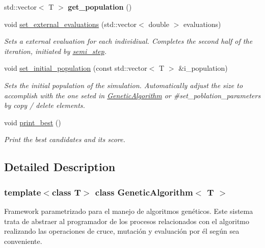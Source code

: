 \begin{DoxyCompactItemize}
\mbox{\label{class_genetic_algorithm_a3265574d1fe7cbe5975ca55ac15cb3d7}} 
std\+::vector$<$ T $>$ {\bfseries get\+\_\+population} ()
\item 
void \mbox{\hyperlink{class_genetic_algorithm_af1632165d5b43d91b290a8a257e0f0e7}{set\+\_\+external\+\_\+evaluations}} (std\+::vector$<$ double $>$ evaluations)
\begin{DoxyCompactList}\small\item\em Sets a external evaluation for each individiual. Completes the second half of the iteration, initiated by \mbox{\hyperlink{class_genetic_algorithm_ab52124a783d776e8ba658bf665e0be66}{semi\+\_\+step}}. \end{DoxyCompactList}\item 
void \mbox{\hyperlink{class_genetic_algorithm_a5ed6d3f823943638e0c3688fdf788e1c}{set\+\_\+initial\+\_\+population}} (const std\+::vector$<$ T $>$ \&i\+\_\+population)
\begin{DoxyCompactList}\small\item\em Sets the initial population of the simulation. Automatically adjust the size to accomplish with the one seted in \mbox{\hyperlink{class_genetic_algorithm}{Genetic\+Algorithm}} or \#set\+\_\+poblation\+\_\+parameters by copy / delete elements. \end{DoxyCompactList}\item 
\mbox{\label{class_genetic_algorithm_a062f45c41d1f652e2f1794a06e8ba161}} 
void \mbox{\hyperlink{class_genetic_algorithm_a062f45c41d1f652e2f1794a06e8ba161}{print\+\_\+best}} ()
\begin{DoxyCompactList}\small\item\em Print the best candidates and its score. \end{DoxyCompactList}\end{DoxyCompactItemize}


\subsection{Detailed Description}
\subsubsection*{template$<$class T$>$\newline
class Genetic\+Algorithm$<$ T $>$}

Framework parametrizado para el manejo de algoritmos genéticos. Este sistema trata de abstraer al programador de los procesos relacionados con el algoritmo realizando las operaciones de cruce, mutación y evaluación por él según sea conveniente. 

